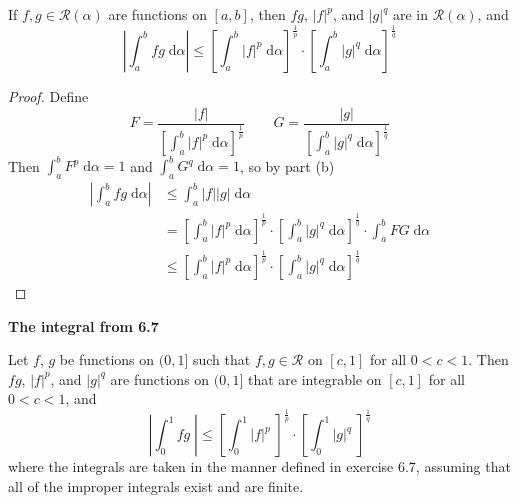 \documentclass{homework}
\begin{document}
\begin{alphaparts}
		\questionpart %
		
		If $f, g\in \mathscr{R}(\alpha)$ are functions on $[a, b]$, then $fg$, $|f|^p$, and $|g|^q$ are in $\mathscr{R}(\alpha)$, and
		$$
		\left|\int_a^bfg\;\text{d}\alpha\right| \le \left[\int_a^b|f|^p\;\text{d}\alpha\right]^\frac{1}{p}\cdot\left[\int_a^b |g|^q\;\text{d}\alpha\right]^\frac{1}{q}
		$$
		\begin{proof}
			Define
			$$
			F = \frac{|f|}{\left[\int_a^b|f|^p\;\text{d}\alpha\right]^\frac{1}{p}} \qquad
			G = \frac{|g|}{\left[\int_a^b|g|^q\;\text{d}\alpha\right]^\frac{1}{q}}
			$$
			Then $\int_a^b F^p\;\text{d}\alpha =1$ and $\int_a^b G^q \;\text{d}\alpha = 1$, so by part (b)
			$$
			\begin{aligned}
				\left|\int_a^bfg\;\text{d}\alpha\right| &\le \int_a^b|f||g|\;\text{d}\alpha\\
				&=\left[\int_a^b|f|^p\;\text{d}\alpha\right]^\frac{1}{p}\cdot\left[\int_a^b|g|^q\;\text{d}\alpha\right]^\frac{1}{q}\cdot\int_a^bFG\;\text{d}\alpha\\
				& \le \left[\int_a^b|f|^p\;\text{d}\alpha\right]^\frac{1}{p}\cdot\left[\int_a^b|g|^q\;\text{d}\alpha\right]^\frac{1}{q}
			\end{aligned}
			$$
		\end{proof}
		
		\questionpart %
		
		\textbf{The integral from 6.7}
		
		Let $f$, $g$ be functions on $(0,1]$ such that $f, g\in\mathscr{R}$ on $[c, 1]$ for all $0 < c < 1$. Then $fg$, $|f|^p$, and $|g|^q$ are functions on $(0,1]$ that are integrable on $[c,1]$ for all $0 < c < 1$, and
		$$
		\left|\int_0^1fg\;\right| \le \left[\int_0^1|f|^p\;\right]^\frac{1}{p}\cdot\left[\int_0^1|g|^q\;\right]^\frac{1}{q}
		$$
		where the integrals are taken in the manner defined in exercise 6.7, assuming that all of the improper integrals exist and are finite.
		

\end{alphaparts}
\end{document}
